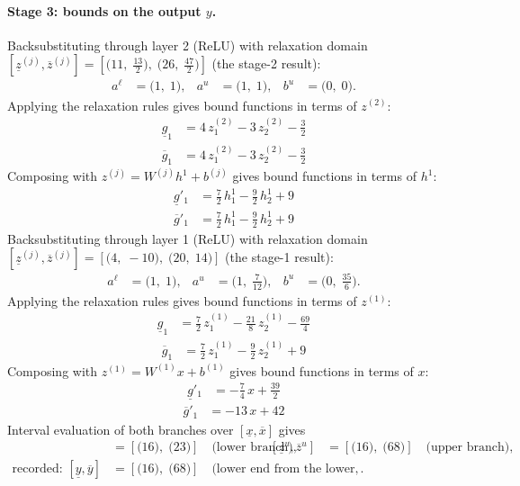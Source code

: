 \documentclass[11pt]{article}
\begin{document}
\paragraph{Stage 3: bounds on the output $y$.}
Backsubstituting through layer 2 (ReLU) with relaxation domain $[\underline{z}^{(j)}, \overline{z}^{(j)}] = [\bigl(11,\; \frac{13}{2}\bigr),\; \bigl(26,\; \frac{47}{2}\bigr)]$ (the stage-2 result):
\begin{align*}
a^{\ell} &= \bigl(1,\; 1\bigr), & a^{u} &= \bigl(1,\; 1\bigr), & b^{u} &= \bigl(0,\; 0\bigr).
\end{align*}
Applying the relaxation rules gives bound functions in terms of $z^{(2)}$:
\begin{align*}
\underline{g}_{1} &= 4\,z^{(2)}_{1} - 3\,z^{(2)}_{2} - \frac{3}{2}
\end{align*}
\begin{align*}
\overline{g}_{1} &= 4\,z^{(2)}_{1} - 3\,z^{(2)}_{2} - \frac{3}{2}
\end{align*}
Composing with $z^{(j)} = W^{(j)} h^{1} + b^{(j)}$ gives bound functions in terms of $h^{1}$:
\begin{align*}
\underline{g}'_{1} &= \frac{7}{2}\,h^{1}_{1} - \frac{9}{2}\,h^{1}_{2} + 9
\end{align*}
\begin{align*}
\overline{g}'_{1} &= \frac{7}{2}\,h^{1}_{1} - \frac{9}{2}\,h^{1}_{2} + 9
\end{align*}
Backsubstituting through layer 1 (ReLU) with relaxation domain $[\underline{z}^{(j)}, \overline{z}^{(j)}] = [\bigl(4,\; -10\bigr),\; \bigl(20,\; 14\bigr)]$ (the stage-1 result):
\begin{align*}
a^{\ell} &= \bigl(1,\; 1\bigr), & a^{u} &= \bigl(1,\; \frac{7}{12}\bigr), & b^{u} &= \bigl(0,\; \frac{35}{6}\bigr).
\end{align*}
Applying the relaxation rules gives bound functions in terms of $z^{(1)}$:
\begin{align*}
\underline{g}_{1} &= \frac{7}{2}\,z^{(1)}_{1} - \frac{21}{8}\,z^{(1)}_{2} - \frac{69}{4}
\end{align*}
\begin{align*}
\overline{g}_{1} &= \frac{7}{2}\,z^{(1)}_{1} - \frac{9}{2}\,z^{(1)}_{2} + 9
\end{align*}
Composing with $z^{(1)} = W^{(1)} x + b^{(1)}$ gives bound functions in terms of $x$:
\begin{align*}
\underline{g}'_{1} &= -\frac{7}{4}\,x + \frac{39}{2}
\end{align*}
\begin{align*}
\overline{g}'_{1} &= -13\,x + 42
\end{align*}
Interval evaluation of both branches over $[\underline{x}, \overline{x}]$ gives
\begin{align*}
[\underline{z}^{\ell}, \overline{z}^{\ell}] &= [\bigl(16\bigr),\; \bigl(23\bigr)] \quad\text{(lower branch)}, & [\underline{z}^{u}, \overline{z}^{u}] &= [\bigl(16\bigr),\; \bigl(68\bigr)] \quad\text{(upper branch)}, \\
\text{recorded: } [\underline{y}, \overline{y}] &= [\bigl(16\bigr),\; \bigl(68\bigr)] \quad\text{(lower end from the lower, upper end from the upper branch)}.
\end{align*}
\end{document}
